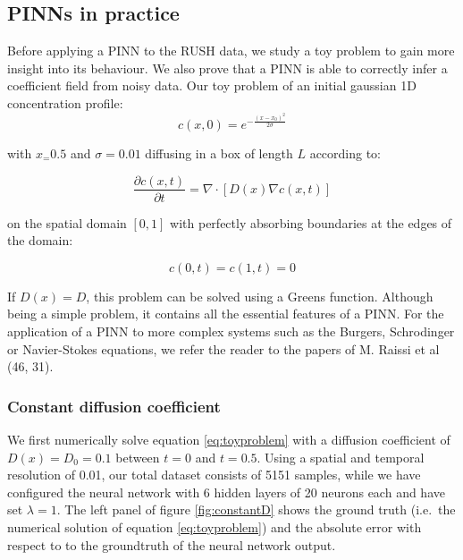 \documentclass{Dissertate}
\begin{document}
\hypertarget{pinns-in-practice}{%
\subsection{PINNs in practice}\label{pinns-in-practice}}

Before applying a PINN to the RUSH data, we study a toy problem to gain
more insight into its behaviour. We also prove that a PINN is able to
correctly infer a coefficient field from noisy data. Our toy problem of
an initial gaussian 1D concentration profile: \[
c(x, 0) = e^{-\frac{(x-x_0)^2}{2\sigma}}
\]

with \(x_ = 0.5\) and \(\sigma =0.01\) diffusing in a box of length
\(L\) according to:

\begin{equation}
\frac{\partial c(x,t)}{\partial t} = \nabla \cdot[D(x)\nabla c(x,t)]
\label{eq:toyproblem}\end{equation}

on the spatial domain \([0,1]\) with perfectly absorbing boundaries at
the edges of the domain:

\[
c(0,t) = c(1,t) = 0
\]

If \(D(x) = D\), this problem can be solved using a Greens function.
Although being a simple problem, it contains all the essential features
of a PINN. For the application of a PINN to more complex systems such as
the Burgers, Schrodinger or Navier-Stokes equations, we refer the reader
to the papers of M. Raissi et al (46, 31).

\hypertarget{constant-diffusion-coefficient}{%
\subsubsection{Constant diffusion
coefficient}\label{constant-diffusion-coefficient}}

We first numerically solve equation \ref{eq:toyproblem} with a
diffusion coefficient of \(D(x) = D_0 = 0.1\) between \(t=0\) and
\(t=0.5\). Using a spatial and temporal resolution of 0.01, our total
dataset consists of 5151 samples, while we have configured the neural
network with 6 hidden layers of 20 neurons each and have set
\(\lambda=1\). The left panel of figure \ref{fig:constantD} shows
the ground truth (i.e.~the numerical solution of equation
\ref{eq:toyproblem}) and the absolute error with respect to to the groundtruth
of the neural network output.
\end{document}
